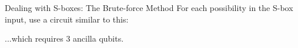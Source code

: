 \documentclass{beamer}
\begin{document}
    \begin{frame}{Dealing with S-boxes: The Brute-force Method}
    For each possibility in the S-box input, use a circuit similar to this:
    \begin{center}
    \end{center}
    ...which requires 3 ancilla qubits.
    \end{frame}
\end{document}
